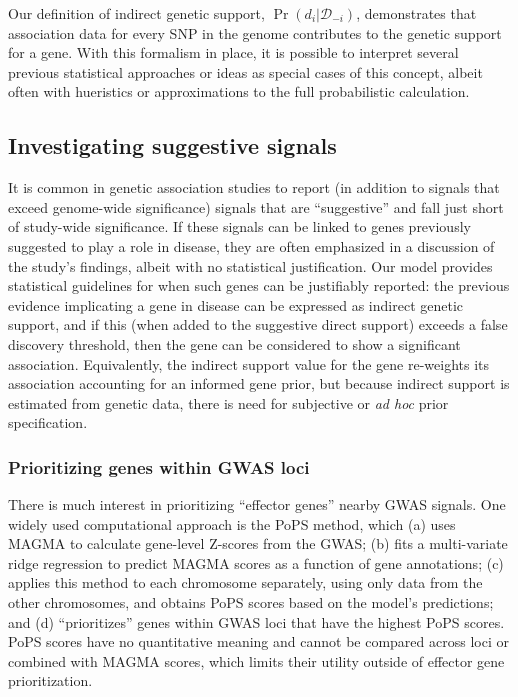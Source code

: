 Our definition of indirect genetic support,
$\Pr\left(d_i|\mathcal{D}_{-i}\right)$, demonstrates that association
data for every SNP in the genome contributes to the genetic support
for a gene. With this formalism in place, it is possible to interpret
several previous statistical approaches or ideas as special cases of
this concept, albeit often with hueristics or approximations to the
full probabilistic calculation.

\subsection{Investigating suggestive signals}
It is common in genetic association studies to report (in addition to
signals that exceed genome-wide significance) signals that are
``suggestive'' and fall just short of study-wide significance. If
these signals can be linked to genes previously suggested to play a
role in disease, they are often emphasized in a discussion of the
study's findings, albeit with no statistical justification. Our model
provides statistical guidelines for when such genes can be justifiably
reported: the previous evidence implicating a gene in disease can be
expressed as indirect genetic support, and if this (when added to the
suggestive direct support) exceeds a false discovery threshold, then
the gene can be considered to show a significant
association. Equivalently, the indirect support value for the gene re-weights its
association accounting for an informed gene prior, but because
indirect support is estimated from genetic data, there is need for
subjective or \textit{ad hoc} prior specification.

\subsubsection{Prioritizing genes within GWAS loci}
There is much interest in prioritizing ``effector genes'' nearby GWAS
signals\cite{costanzo}. One widely used computational approach is the
PoPS method\cite{}, which (a) uses MAGMA\cite{} to calculate
gene-level Z-scores from the GWAS; (b) fits a multi-variate ridge
regression to predict MAGMA scores as a function of gene annotations;
(c) applies this method to each chromosome separately, using only data
from the other chromosomes, and obtains PoPS scores based on the
model's predictions; and (d) ``prioritizes'' genes
within GWAS loci that have the highest PoPS scores. PoPS scores have
no quantitative meaning and cannot be compared across loci or combined
with MAGMA scores, which limits their utility outside of effector gene
prioritization.

